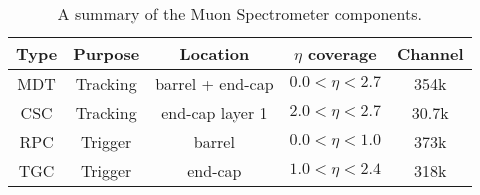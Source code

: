\begin{table}[htbp]
\begin{center}
\begin{tabular}{ccccc}
\hline
\hline
Type & Purpose & Location & $\eta$ coverage & Channel\\
\hline
MDT & Tracking & barrel + end-cap & $0.0 < \eta < 2.7$ & 354k\\
CSC & Tracking & end-cap layer 1 & $2.0 < \eta < 2.7$ & 30.7k\\
RPC & Trigger & barrel & $0.0 < \eta < 1.0$ & 373k\\
TGC & Trigger & end-cap & $1.0 < \eta < 2.4$ & 318k\\
\hline
\hline
\end{tabular}
\end{center}
\caption{A summary of the Muon Spectrometer components.}
\label{tab:muon_spectrometer_components}
\end{table}%



   
   
   
   









